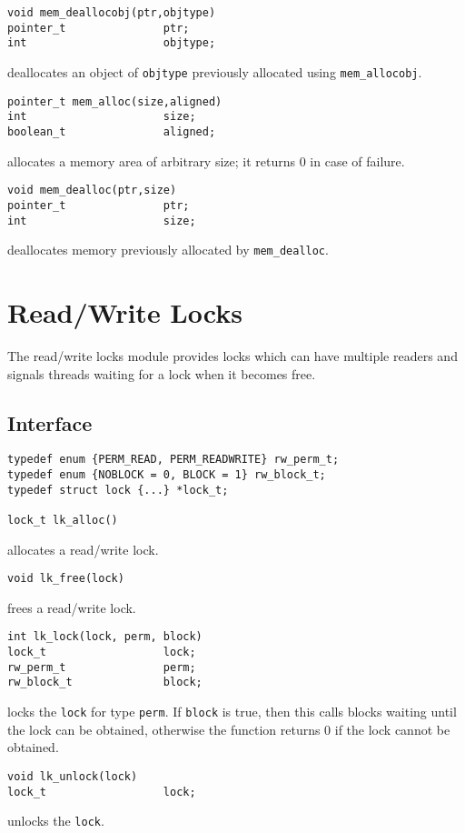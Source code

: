 \begin{verbatim}
void mem_deallocobj(ptr,objtype)
pointer_t               ptr;
int                     objtype;
\end{verbatim}
deallocates an object of \verb"objtype" previously allocated using
\verb"mem_allocobj".

\begin{verbatim}
pointer_t mem_alloc(size,aligned)
int                     size;
boolean_t               aligned;
\end{verbatim}
allocates a memory area of arbitrary size; it returns 0 in case of failure.

\begin{verbatim}
void mem_dealloc(ptr,size)
pointer_t               ptr;
int                     size;
\end{verbatim}
deallocates memory previously allocated by \verb"mem_dealloc".

\section{Read/Write Locks}
The read/write locks module provides locks which can have multiple readers
and signals threads waiting for a lock when it becomes free.

\subsection{Interface}
\begin{verbatim}
typedef enum {PERM_READ, PERM_READWRITE} rw_perm_t;
typedef enum {NOBLOCK = 0, BLOCK = 1} rw_block_t;
typedef struct lock {...} *lock_t;

lock_t lk_alloc()
\end{verbatim}
allocates a read/write lock.

\begin{verbatim}
void lk_free(lock)
\end{verbatim}
frees a read/write lock.

\begin{verbatim}
int lk_lock(lock, perm, block)
lock_t                  lock;
rw_perm_t               perm;
rw_block_t              block;
\end{verbatim}
locks the \verb"lock" for type \verb"perm".  If \verb"block" is true, then
this calls blocks waiting until the lock can be obtained, otherwise the
function returns 0 if the lock cannot be obtained.

\begin{verbatim}
void lk_unlock(lock)
lock_t                  lock;
\end{verbatim}
unlocks the \verb"lock".

